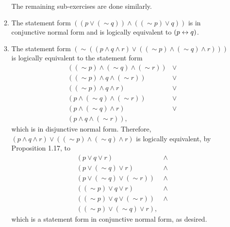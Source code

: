 \begin{enumerate}
\begin{enumerate}[label = (\alph*), align = left]
        The remaining sub-exercises are done similarly.

      \item The statement form \(((p \lor (\sim q)) \land ((\sim p) \lor q))\) is in conjunctive normal form and is logically equivalent to \((p \leftrightarrow q)\).

      \item The statement form \((\sim((p \land q \land r) \lor ((\sim p) \land (\sim q) \land r)))\) is logically equivalent to the statement form
        \[
          \begin{array}{cc}
            ((\sim p) \land (\sim q) \land (\sim r))&
            \lor\\
            ((\sim p) \land q \land (\sim r))&
            \lor\\
            ((\sim p) \land q \land r)&
            \lor\\
            (p \land (\sim q) \land (\sim r))&
            \lor\\
            (p \land (\sim q) \land r)&
            \lor\\
            (p \land q \land (\sim r)),&
          \end{array}
        \]
        which is in disjunctive normal form. Therefore, \((p \land q \land r) \lor ((\sim p) \land (\sim q) \land r)\) is logically equivalent, by Proposition 1.17, to
        \[
          \begin{array}{cc}
            (p \lor q \lor r)&
            \land\\
            (p \lor (\sim q) \lor r)&
            \land\\
            (p \lor (\sim q) \lor (\sim r))&
            \land\\
            ((\sim p) \lor q \lor r)&
            \land\\
            ((\sim p) \lor q \lor (\sim r))&
            \land\\
            ((\sim p) \lor (\sim q) \lor r),&
          \end{array}
        \]
        which is a statement form in conjunctive normal form, as desired.


\end{enumerate}
\end{enumerate}
